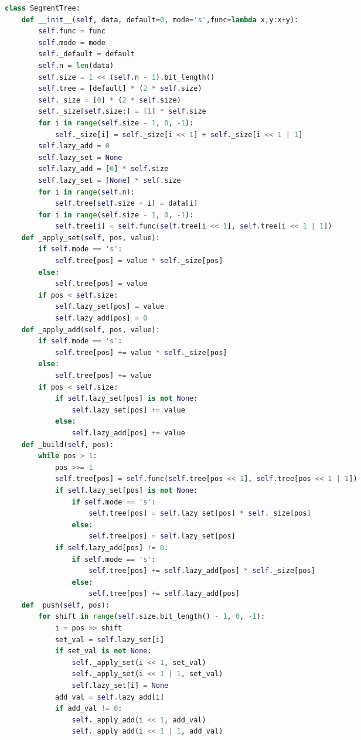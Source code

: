 \documentclass[10pt,landscape, a4paper]{article}
\begin{document}
\begin{multicols*}{3}
\begin{lstlisting}[language=Python]
class SegmentTree:
    def __init__(self, data, default=0, mode='s',func=lambda x,y:x+y):
        self.func = func
        self.mode = mode
        self._default = default
        self.n = len(data)
        self.size = 1 << (self.n - 1).bit_length()
        self.tree = [default] * (2 * self.size)
        self._size = [0] * (2 * self.size)
        self._size[self.size:] = [1] * self.size
        for i in range(self.size - 1, 0, -1):
            self._size[i] = self._size[i << 1] + self._size[i << 1 | 1]
        self.lazy_add = 0
        self.lazy_set = None
        self.lazy_add = [0] * self.size
        self.lazy_set = [None] * self.size
        for i in range(self.n):
            self.tree[self.size + i] = data[i]
        for i in range(self.size - 1, 0, -1):
            self.tree[i] = self.func(self.tree[i << 1], self.tree[i << 1 | 1])
    def _apply_set(self, pos, value):
        if self.mode == 's':
            self.tree[pos] = value * self._size[pos]
        else:
            self.tree[pos] = value
        if pos < self.size:
            self.lazy_set[pos] = value
            self.lazy_add[pos] = 0
    def _apply_add(self, pos, value):
        if self.mode == 's':
            self.tree[pos] += value * self._size[pos]
        else:
            self.tree[pos] += value
        if pos < self.size:
            if self.lazy_set[pos] is not None:
                self.lazy_set[pos] += value
            else:
                self.lazy_add[pos] += value
    def _build(self, pos):
        while pos > 1:
            pos >>= 1
            self.tree[pos] = self.func(self.tree[pos << 1], self.tree[pos << 1 | 1])
            if self.lazy_set[pos] is not None:
                if self.mode == 's':
                    self.tree[pos] = self.lazy_set[pos] * self._size[pos]
                else:
                    self.tree[pos] = self.lazy_set[pos]
            if self.lazy_add[pos] != 0:
                if self.mode == 's':
                    self.tree[pos] += self.lazy_add[pos] * self._size[pos]
                else:
                    self.tree[pos] += self.lazy_add[pos]
    def _push(self, pos):
        for shift in range(self.size.bit_length() - 1, 0, -1):
            i = pos >> shift
            set_val = self.lazy_set[i]
            if set_val is not None:
                self._apply_set(i << 1, set_val)
                self._apply_set(i << 1 | 1, set_val)
                self.lazy_set[i] = None
            add_val = self.lazy_add[i]
            if add_val != 0:
                self._apply_add(i << 1, add_val)
                self._apply_add(i << 1 | 1, add_val)

\end{lstlisting}
\end{multicols*}
\end{document}
